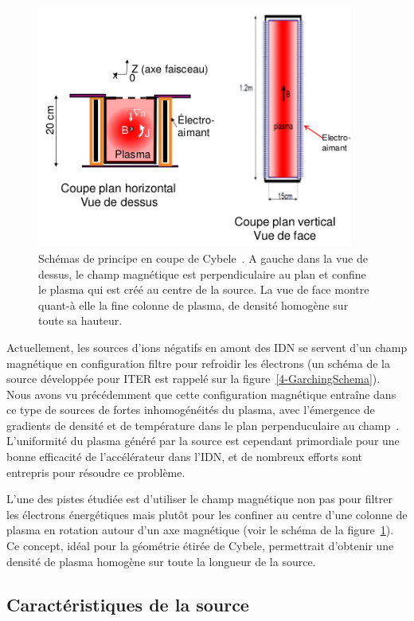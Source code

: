 \begin{refsection}
\begin{figure}[!htbp]
  \centering
    \includegraphics[height=8cm]{figures/4-cybeleSchema.png}
    \caption{Schémas de principe en coupe de Cybele~\parencite{SimoninHDR}. A
    gauche dans la vue de dessus, le champ magnétique est perpendiculaire au plan et confine le
plasma qui est créé au centre de la source. La vue de face montre quant-à elle
la fine colonne de plasma, de densité homogène sur toute sa hauteur.
\label{4-cybeleSchema}}
\end{figure}	

Actuellement, les sources d'ions négatifs en amont des IDN se servent d'un champ
magnétique en configuration filtre pour refroidir les électrons (un schéma de la
source développée pour ITER est rappelé sur la figure~\ref{4-GarchingSchema}).
Nous avons vu précédemment que cette configuration magnétique entraîne
dans ce type de sources de fortes inhomogénéités du plasma, avec l'émergence de
gradients de densité et de température dans le plan
perpenduculaire au champ~\parencite{Fantz,Kolev}.
L'uniformité du plasma généré par la source est cependant primordiale pour une
bonne efficacité de l'accélérateur dans l'IDN, et de nombreux efforts sont
entrepris pour résoudre ce problème.

L'une des pistes étudiée est d'utiliser le champ magnétique non pas pour
filtrer les électrons énergétiques mais plutôt pour les confiner au centre
d'une colonne de plasma en rotation autour d'un axe magnétique (voir le schéma
de la figure~\ref{4-cybeleSchema}). Ce concept,
idéal pour la géométrie étirée de Cybele, permettrait d'obtenir une densité de
plasma homogène sur toute la longueur de la source. 

\subsection{Caractéristiques de la source}


\end{refsection}
